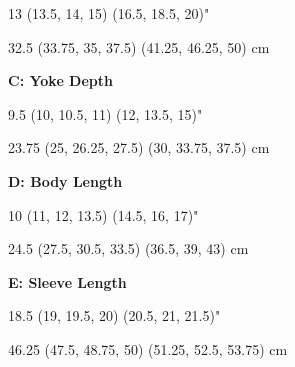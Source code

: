 \documentclass[12pt]{article}
\begin{document}
\begin{multicols}{2}
{\begin{addmargin}[4em]{-2em}
\hspace{1em} 13 (13.5, 14, 15) (16.5, 18.5, 20)"

\hspace{1em} 32.5 (33.75, 35, 37.5) (41.25, 46.25, 50) cm 

{\normalsize\textbf{\textsf{C: Yoke Depth}}}

\hspace{1em} 9.5 (10, 10.5, 11) (12, 13.5, 15)"

\hspace{1em} 23.75 (25, 26.25, 27.5) (30, 33.75, 37.5) cm

{\normalsize\textbf{\textsf{D: Body Length}}}

\hspace{1em} 10 (11, 12, 13.5) (14.5, 16, 17)"

\hspace{1em} 24.5 (27.5, 30.5, 33.5) (36.5, 39, 43) cm 

{\normalsize\textbf{\textsf{E: Sleeve Length}}}

\hspace{1em} 18.5 (19, 19.5, 20) (20.5, 21, 21.5)"

\hspace{1em} 46.25 (47.5, 48.75, 50) (51.25, 52.5, 53.75) cm
\end{addmargin}}
\end{multicols}
\end{document}
